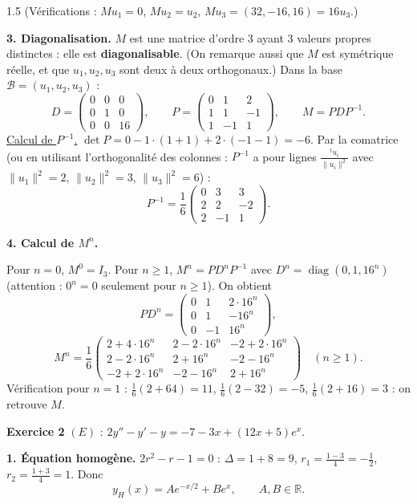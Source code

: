 \documentclass[12pt]{article}
\begin{document}
\begin{spacing}{1.5}
(Vérifications : $Mu_1=0$, $Mu_2=u_2$, $Mu_3=(32,-16,16)=16u_3$.)

\textbf{3. Diagonalisation.} $M$ est une matrice d'ordre 3 ayant 3 valeurs propres distinctes : elle est \textbf{diagonalisable}. (On remarque aussi que $M$ est symétrique réelle, et que $u_1,u_2,u_3$ sont deux à deux orthogonaux.) Dans la base $\mathcal{B}=(u_1,u_2,u_3)$ :
\[
D=\begin{pmatrix}0&0&0\\0&1&0\\0&0&16\end{pmatrix},\qquad P=\begin{pmatrix}0&1&2\\1&1&-1\\1&-1&1\end{pmatrix},\qquad M=PDP^{-1}.
\]
\underline{Calcul de $P^{-1}$.} $\det P=0-1\cdot(1+1)+2\cdot(-1-1)=-6$. Par la comatrice (ou en utilisant l'orthogonalité des colonnes : $P^{-1}$ a pour lignes $\frac{{}^tu_i}{\|u_i\|^2}$ avec $\|u_1\|^2=2$, $\|u_2\|^2=3$, $\|u_3\|^2=6$) :
\[
P^{-1}=\frac16\begin{pmatrix}0&3&3\\2&2&-2\\2&-1&1\end{pmatrix}.
\]

\textbf{4. Calcul de $M^n$.}

Pour $n=0$, $M^0=I_3$. Pour $n\ge1$, $M^n=PD^nP^{-1}$ avec $D^n=\operatorname{diag}(0,1,16^n)$ (attention : $0^n=0$ seulement pour $n\ge1$). On obtient
\[
PD^n=\begin{pmatrix}0&1&2\cdot16^n\\0&1&-16^n\\0&-1&16^n\end{pmatrix},
\]
\[
\boxed{M^n=\frac16\begin{pmatrix}2+4\cdot16^n&2-2\cdot16^n&-2+2\cdot16^n\\2-2\cdot16^n&2+16^n&-2-16^n\\-2+2\cdot16^n&-2-16^n&2+16^n\end{pmatrix}}\quad(n\ge1).
\]
Vérification pour $n=1$ : $\frac16(2+64)=11$, $\frac16(2-32)=-5$, $\frac16(2+16)=3$ : on retrouve $M$.

\medskip\textbf{Exercice 2} \quad $(E)$ : $2y''-y'-y=-7-3x+(12x+5)e^x$.

\textbf{1. Équation homogène.} $2r^2-r-1=0$ : $\Delta=1+8=9$, $r_1=\frac{1-3}{4}=-\frac12$, $r_2=\frac{1+3}4=1$. Donc
\[
y_H(x)=Ae^{-x/2}+Be^{x},\qquad A,B\in\mathbb{R}.
\]


\end{spacing}
\end{document}
